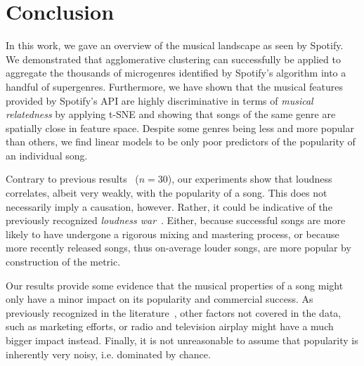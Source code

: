 \documentclass{article}
\begin{document}
\section{Conclusion}

In this work, we gave an overview of the musical landscape as seen by Spotify.
We demonstrated that agglomerative clustering can successfully be applied to aggregate the thousands of microgenres identified by Spotify's algorithm into a handful of supergenres. 
Furthermore, we have shown that the musical features provided by Spotify's API are highly discriminative in terms of \emph{musical relatedness} by applying t-SNE and showing that songs of the same genre are spatially close in  feature space. Despite some genres being less and more popular than others, we find linear models to be only poor predictors of the popularity of an individual song.

Contrary to previous results~\cite{viney2008obsession} ($n=30$), our experiments show that loudness correlates, albeit very weakly, with the popularity of a song. This does not necessarily imply a causation, however. Rather, it could be indicative of the previously recognized \emph{loudness war}~\cite{vickers2010loudness}. Either, because successful songs are more likely to have undergone a rigorous mixing and mastering process, or because more recently released songs, thus on-average louder songs, are more popular by construction of the metric.

Our results provide some evidence that the musical properties of a song might only have a minor impact on its popularity and commercial success. As previously recognized in the literature~\cite{viney2008obsession}, other factors not covered in the data, such as marketing efforts, or radio and television airplay might have a much bigger impact instead. Finally, it is not unreasonable to assume that popularity is inherently very noisy, i.e. dominated by chance.  




\end{document}
